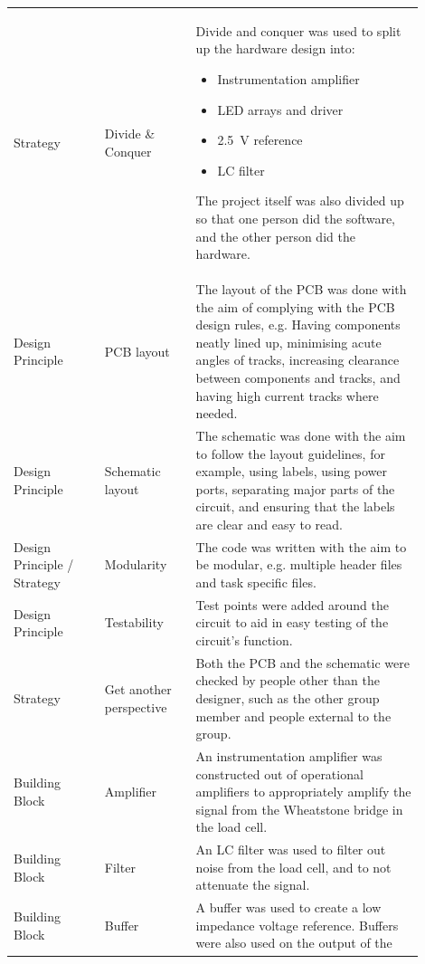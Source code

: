 \documentclass[twoside]{article}
\begin{document}
\begin{appendices}
\begin{center}
\begin{longtable}{ p{0.2\linewidth} p{0.2\linewidth} p{0.5\linewidth}}
                Strategy & Divide \& Conquer & Divide and conquer was used to split up the hardware design into:
                \begin{itemize}
                    \item Instrumentation amplifier
                    \item LED arrays and driver
                    \item \SI{2.5}{\volt} reference
                    \item LC filter
                \end{itemize} 
                The project itself was also divided up so that one person did the software, and the other person did the hardware. \\
                Design Principle & PCB layout & The layout of the PCB was done with the aim of complying with the PCB design rules, e.g. Having components neatly lined up, minimising acute angles of tracks, increasing clearance between components and tracks, and having high current tracks where needed. \\
                Design Principle & Schematic layout & The schematic was done with the aim to follow the layout guidelines, for example, using labels, using power ports, separating major parts of the circuit, and ensuring that the labels are clear and easy to read. \\
                Design Principle / Strategy & Modularity & The code was written with the aim to be modular, e.g. multiple header files and task specific files. \\
                Design Principle & Testability & Test points were added around the circuit to aid in easy testing of the circuit's function. \\
                Strategy & Get another perspective & Both the PCB and the schematic were checked by people other than the designer, such as the other group member and people external to the group. \\
                Building Block & Amplifier & An instrumentation amplifier was constructed out of operational amplifiers to appropriately amplify the signal from the Wheatstone bridge in the load cell. \\
                Building Block & Filter & An LC filter was used to filter out noise from the load cell, and to not attenuate the signal. \\
                Building Block & Buffer & A buffer was used to create a low impedance voltage reference. Buffers were also used on the output of the 

\end{longtable}
\end{center}
\end{appendices}
\end{document}
